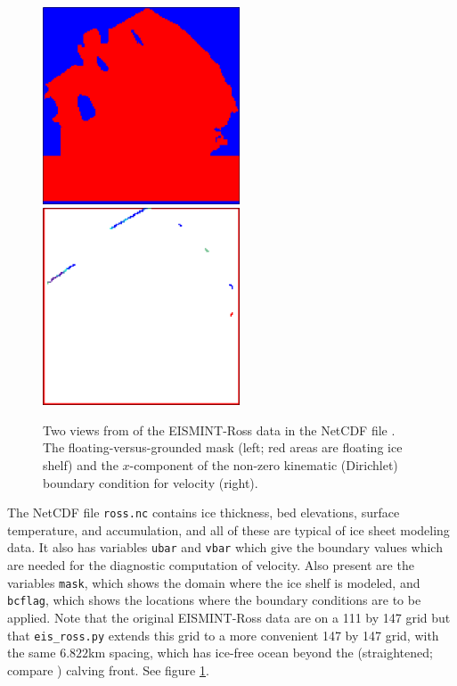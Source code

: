\documentclass[11pt,final]{amsart}
\begin{document}
\begin{figure}[ht]
\includegraphics[height=2.3in,keepaspectratio=true]{figs/rossmask} \qquad \includegraphics[height=2.3in,keepaspectratio=true]{figs/rossubar}
\caption{Two views from  of the EISMINT-Ross data in the NetCDF file .  The floating-versus-grounded mask (left; red areas are floating ice shelf) and the $x$-component of the non-zero kinematic (Dirichlet) boundary condition for velocity (right).}
\label{fig:rossmaskubar}
\end{figure}

The NetCDF file \verb|ross.nc| contains ice thickness, bed elevations, surface temperature, and accumulation, and all of these are typical of ice sheet modeling data.  It also has variables \verb|ubar| and \verb|vbar| which give the boundary values which are needed for the diagnostic computation of velocity.  Also present are the variables \verb|mask|, which shows the domain where the ice shelf is modeled, and \verb|bcflag|, which shows the locations where the boundary conditions are to be applied.  Note that the original EISMINT-Ross data are on a 111 by 147 grid but that \verb|eis_ross.py| extends this grid to a more convenient 147 by 147 grid, with the same $6.822$km spacing, which has ice-free ocean beyond the (straightened; compare \cite{MacAyealetal}) calving front.  See figure \ref{fig:rossmaskubar}.
\end{document}
